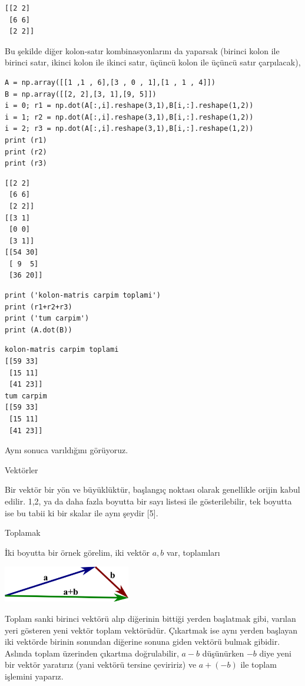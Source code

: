 \documentclass[12pt,fleqn]{article}\usepackage{../../common}
\begin{document}
\begin{verbatim}
[[2 2]
 [6 6]
 [2 2]]
\end{verbatim}

Bu şekilde diğer kolon-satır kombinasyonlarını da yaparsak (birinci kolon ile
birinci satır, ikinci kolon ile ikinci satır, üçüncü kolon ile üçüncü satır
çarpılacak),

\begin{verbatim}
A = np.array([[1 ,1 , 6],[3 , 0 , 1],[1 , 1 , 4]])
B = np.array([[2, 2],[3, 1],[9, 5]])
i = 0; r1 = np.dot(A[:,i].reshape(3,1),B[i,:].reshape(1,2))
i = 1; r2 = np.dot(A[:,i].reshape(3,1),B[i,:].reshape(1,2))
i = 2; r3 = np.dot(A[:,i].reshape(3,1),B[i,:].reshape(1,2))
print (r1)
print (r2)
print (r3)
\end{verbatim}

\begin{verbatim}
[[2 2]
 [6 6]
 [2 2]]
[[3 1]
 [0 0]
 [3 1]]
[[54 30]
 [ 9  5]
 [36 20]]
\end{verbatim}

\begin{verbatim}
print ('kolon-matris carpim toplami')
print (r1+r2+r3)
print ('tum carpim')
print (A.dot(B))
\end{verbatim}

\begin{verbatim}
kolon-matris carpim toplami
[[59 33]
 [15 11]
 [41 23]]
tum carpim
[[59 33]
 [15 11]
 [41 23]]
\end{verbatim}

Aynı sonuca varıldığını görüyoruz.

Vektörler

Bir vektör bir yön ve büyüklüktür, başlangıç noktası olarak genellikle orijin
kabul edilir. 1,2, ya da daha fazla boyutta bir sayı listesi ile gösterilebilir,
tek boyutta ise bu tabii ki bir skalar ile aynı şeydir [5]. 

Toplamak

İki boyutta bir örnek görelim, iki vektör $a,b$ var, toplamları

\includegraphics[width=15em]{vector_a_plus_b.png}

Toplam sanki birinci vektörü alıp diğerinin bittiği yerden başlatmak gibi,
varılan yeri gösteren yeni vektör toplam vektörüdür. Çıkartmak ise aynı yerden
başlayan iki vektörde birinin sonundan diğerine sonuna giden vektörü bulmak
gibidir. Aslında toplam üzerinden çıkartma doğrulabilir, $a-b$ düşünürken $-b$
diye yeni bir vektör yaratırız (yani vektörü tersine çeviririz) ve $a+(-b)$ ile
toplam işlemini yaparız.
\end{document}
